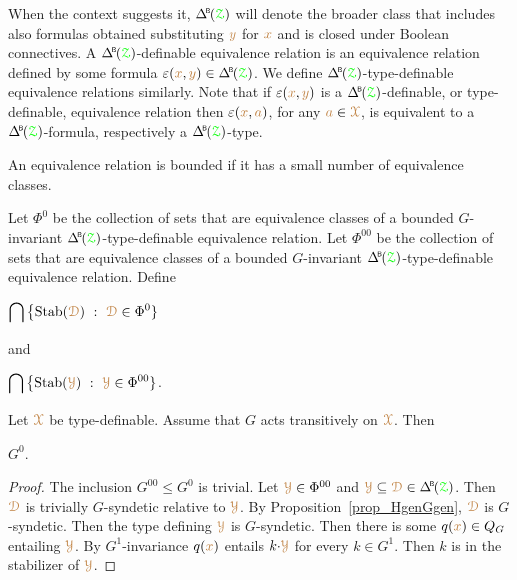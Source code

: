 When the context suggests it, $\BDelta(\grZ)$ will denote the broader class that includes also formulas obtained substituting ${\color{brown} y}$ for ${\color{brown} x}$ and is closed under Boolean connectives.
A $\BDelta(\grZ)$-definable equivalence relation is an equivalence relation defined by some formula $\epsilon({\mr x},{\mr y})\in\BDelta(\grZ)$.
We define $\BDelta(\grZ)$-type-definable equivalence relations similarly.
Note that if $\varepsilon({\color{brown} x},{\color{brown} y})$ is a $\BDelta(\grZ)$-definable, or type-definable, equivalence relation then $\varepsilon({\color{brown} x},{\color{brown} a})$, for any ${\color{brown} a}\in{\color{brown}\EuScript X}$, is equivalent to a $\BDelta(\grZ)$-formula, respectively a $\BDelta(\grZ)$-type.

An equivalence relation is bounded if it has a small number of equivalence classes.

\begin{definition}\label{def_G00}
  Let $\Phi^0$ be the collection of sets that are equivalence classes of a bounded $G$-invariant $\BDelta(\grZ)$-type-definable equivalence relation.
  Let $\Phi^{00}$ be the collection of sets that are equivalence classes of a bounded $G$-invariant $\BDelta(\grZ)$-type-definable equivalence relation.
  Define
  \smallskip

  \medrel{=}$\displaystyle\bigcap\big\{\Stab(\mrD)\ :\  \mrD\in\Phi^0\}$

  and

  \medrel{=}$\displaystyle\bigcap\big\{\Stab(\mrY)\ :\  \mrY\in\Phi^{00}\}$.

\end{definition}

\begin{proposition}
  Let ${\color{brown}\EuScript X}$ be type-definable.
  Assume that $G$ acts transitively on ${\color{brown}\EuScript X}$.
  Then 
  
  \medrel{\leq}$G^0$.
\end{proposition}

\begin{proof}
  The inclusion $G^{00}\leq G^0$ is trivial.
  Let ${\color{brown}\EuScript Y}\in\Phi^{00}$ and $\mrY\subseteq\mrD\in\BDelta(\grZ)$.
  Then ${\color{brown}\EuScript D}$ is trivially $G$-syndetic relative to ${\color{brown}\EuScript Y}$.
  By Proposition~\ref{prop_HgenGgen}, ${\color{brown}\EuScript D}$ is $G$-syndetic.
  Then the type defining ${\color{brown}\EuScript Y}$ is $G$-syndetic.
  Then there is some $q({\color{brown} x})\in Q_G$ entailing ${\color{brown}\EuScript Y}$.
  By $G^1$-invariance $q({\color{brown} x})$ entails $k{\cdot}{\color{brown}\EuScript Y}$ for every $k\in G^1$.
  Then $k$ is in the stabilizer of ${\color{brown}\EuScript Y}$.
\end{proof}

